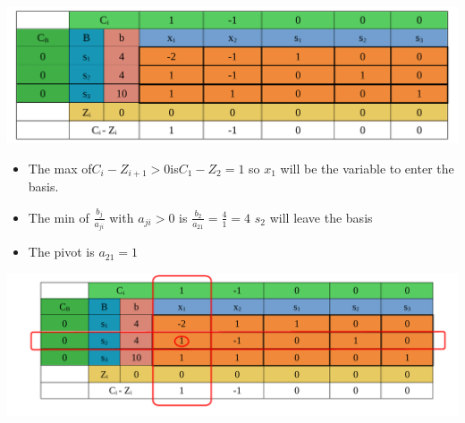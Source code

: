 \vspace{0.35cm}

\begin{center}
    \includegraphics{Chapters/Simplexe/EX/EX4/ex4.1.pdf}
\end{center}

\vspace{0.25cm}
\begin{itemize}   
    \item The max of\hspace{0.2cm}\(C_i - Z_{i+1} > 0\)\hspace{0.2cm}is\hspace{0.2cm}\(C_1 - Z_2 = 1\)\hspace{0.1cm} so \(x_1\) 
will be the variable to enter the basis.
\item The min of \hspace{0.1cm}\(\frac{b_j}{a_{ji}}\)\hspace{0.1cm} with \(a_{ji} > 0\)\hspace{0.1cm} is \hspace{0.1cm} \(\frac{b_2}{a_{21}} = \frac{4}{1} = 4\)\hspace{0.35cm} \(s_2\)
will leave the basis
\item The pivot is \(a_{21} = 1\)
 
\end{itemize}


\vspace{0.25cm}




\begin{center}
    \includegraphics{Chapters/Simplexe/EX/EX4/ex4.2.pdf}
\end{center}

